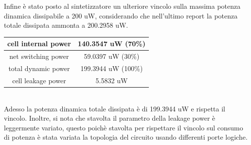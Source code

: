 Infine è stato posto al sintetizzatore un ulteriore vincolo sulla massima potenza dinamica dissipabile a 200 uW, considerando che nell’ultimo report la potenza totale dissipata ammonta a 200.2958 uW.
\\
\begin{table}[!h]\footnotesize
	\centering
	\begin{tabular}{|c|c|}
		\hline
		cell internal power & 140.3547 uW (70\%)\\
		\hline
		net switching power & 59.0397 uW (30\%)\\
		\hline
		\hline
		total dynamic power & 199.3944 uW (100\%)\\
		\hline
		cell leakage power & 5.5832 uW\\
		\hline
	\end{tabular}
\end{table} \\
Adesso la potenza dinamica totale dissipata è di 199.3944 uW e rispetta il vincolo.
Inoltre, si nota che stavolta il parametro della leakage power è leggermente variato, questo poichè stavolta per rispettare il vincolo sul consumo di potenza è stata variata la topologia del circuito usando differenti porte logiche.
\\

